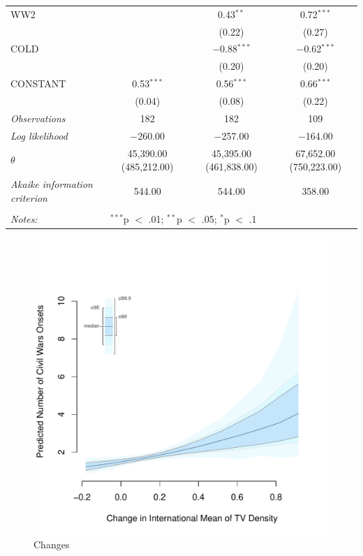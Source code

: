 \documentclass[11pt,article,oneside]{memoir}
\makeatletter
\def\maxwidth{\ifdim\Gin@nat@width>\linewidth\linewidth
\else\Gin@nat@width\fi}
\let\Oldincludegraphics\includegraphics
\renewcommand{\includegraphics}[1]{\Oldincludegraphics[width=\maxwidth]{#1}}
\makeatother
\begin{document}
\begin{table}[!htbp]
\begin{tabular}{@{\extracolsep{5pt}}lccc}
  WW2 &  & 0.43$^{**}$ & 0.72$^{***}$ \\ 
  &  & (0.22) & (0.27) \\ 
  COLD &  & $-$0.88$^{***}$ & $-$0.62$^{***}$ \\ 
  &  & (0.20) & (0.20) \\ 
  CONSTANT & 0.53$^{***}$ & 0.56$^{***}$ & 0.66$^{***}$ \\ 
  & (0.04) & (0.08) & (0.22) \\ 
 \textit{Observations} & 182 & 182 & 109 \\ 
\textit{Log likelihood} & $-$260.00 & $-$257.00 & $-$164.00 \\ 
$\theta$ & 45,390.00  (485,212.00) & 45,395.00  (461,838.00) & 67,652.00  (750,223.00) \\ 
\textit{Akaike information criterion} & 544.00 & 544.00 & 358.00 \\ 
\hline \\[-1.8ex] 
\textit{Notes:} & \multicolumn{3}{l}{$^{***}$p $<$ .01; $^{**}$p $<$ .05; $^{*}$p $<$ .1} \\ 
\end{tabular} 
\end{table}

\clearpage

\begin{figure} 
\includegraphics{figure/dtv_effect.pdf} 
\caption{Changes} 
\label{myFigur} 
\end{figure}
\end{document}
